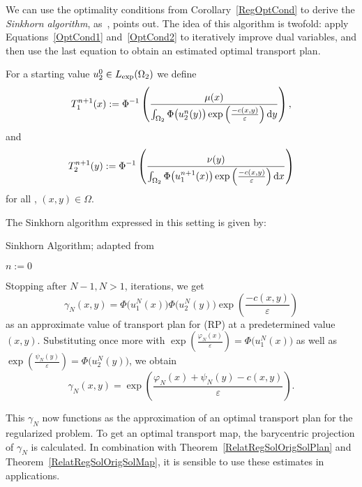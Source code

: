 We can use the optimality conditions from Corollary~\ref{RegOptCond} to derive the \textit{Sinkhorn algorithm}, as\ \cite[Remark~4.9]{Cla2021}, points out. The idea of this algorithm is twofold: apply Equations~\ref{OptCond1} and\ \ref{OptCond2} to iteratively improve dual variables, and then use the last equation to obtain an estimated optimal transport plan.

For a starting value $u_2^0 \in \Lexp[\Omega_2]$ we define
\[ T_1^{n + 1}(x) := \Phi^{-1} \left( \frac{\mu(x)}{\int_{\Omega_2} \Phi\big( u_2^n(y) \big) \exp\left( \frac{-c(x, y)}{\varepsilon} \right)\D[y]} \right), \]
and
\[ T_2^{n + 1}(y) := \Phi^{-1} \left( \frac{\nu(y)}{\int_{\Omega_2} \Phi\big( u_1^{n + 1}(x) \big) \exp\left( \frac{-c(x, y)}{\varepsilon} \right)\D[x]} \right) \]
for all \NinN, $(x, y) \in \Omega$.

The Sinkhorn algorithm expressed in this setting is given by:
\begin{algorithm}\label{SinkhornAlg}
	\caption{Sinkhorn Algorithm; adapted from\ {\cite[Remark~4.9]{Cla2021}}}
	$n := 0$\;
\end{algorithm}

Stopping after $N - 1, N > 1$, iterations, we get
\[ \gamma_N(x, y) = \Phi\big( u_1^N(x) \big) \Phi\big( u_2^N(y) \big) \exp\left( \frac{- c(x, y)}{\varepsilon} \right) \]
as an approximate value of transport plan for (RP) at a predetermined value $(x, y)$. Substituting once more with $\exp\left( \frac{\varphi_N(x)}{\varepsilon} \right) = \Phi\big( u_1^N(x) \big)$ as well as $\exp\left( \frac{\psi_N(y)}{\varepsilon} \right) = \Phi\big( u_2^N(y) \big)$, we obtain
\begin{equation}\label{RegApprTransPlan}
	\gamma_N(x, y) = \exp\left( \frac{\varphi_N(x) + \psi_N(y) - c(x, y)}{\varepsilon} \right).
\end{equation}

This $\gamma_N$ now functions as the approximation of an optimal transport plan for the regularized problem. To get an optimal transport map, the barycentric projection of $\gamma_N$ is calculated. In combination with Theorem~\ref{RelatRegSolOrigSolPlan} and Theorem~\ref{RelatRegSolOrigSolMap}, it is sensible to use these estimates in applications.

